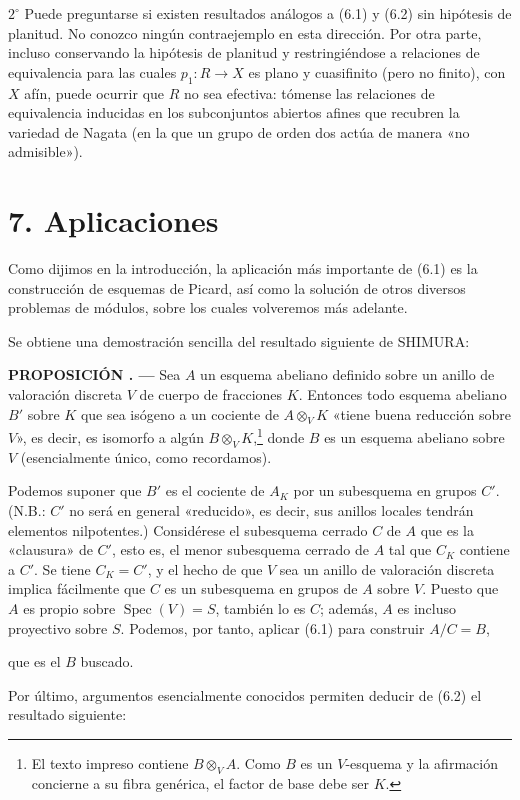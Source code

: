 \documentclass[11pt,twoside,openany]{book}
\numberwithin{equation}{section}
\newcommand{\src}[1]{%
  \phantomsection\hypertarget{src:#1}{}%
  \marginpar{\raggedleft\footnotesize\sffamily #1}%
}
\theoremstyle{plain}
\theoremstyle{definition}
\theoremstyle{remark}
\newcommand{\fsection}[2]{%
  \section*{#1. #2}%
  \addcontentsline{toc}{section}{#1. #2}%
}
\newcommand{\result}[2]{%
  \par\medskip\noindent\textbf{#1%
  \if\relax\detokenize{#2}\relax\else\space#2\fi. ---}\enspace
}
\newcommand{\FgaUnitKey}{frontmatter}
\renewcommand{\src}[1]{%
  \phantomsection\hypertarget{src:\FgaUnitKey:#1}{}%
  \marginpar{\raggedleft\footnotesize\sffamily #1}%
}
\theoremstyle{plain}
\theoremstyle{definition}
\theoremstyle{remark}
\begin{document}
\smallskip
\noindent $2^\circ$ Puede preguntarse si existen resultados análogos a (6.1)
y (6.2) sin hipótesis de planitud. No conozco ningún contraejemplo en esta
dirección. Por otra parte, incluso conservando la hipótesis de planitud y
restringiéndose a relaciones de equivalencia para las cuales $p_1:R\to X$ es
plano y cuasifinito (pero no finito), con $X$ afín, puede ocurrir que $R$ no
sea efectiva: tómense las relaciones de equivalencia inducidas en los
subconjuntos abiertos afines que recubren la variedad de Nagata (en la que un
grupo de orden dos actúa de manera «no admisible»).

\fsection{7}{Aplicaciones}

Como dijimos en la introducción, la aplicación más importante de (6.1) es la
construcción de esquemas de Picard, así como la solución de otros diversos
problemas de módulos, sobre los cuales volveremos más adelante.

Se obtiene una demostración sencilla del resultado siguiente de SHIMURA:

\result{PROPOSICIÓN}{7.1} Sea $A$ un esquema abeliano definido sobre un
anillo de valoración discreta $V$ de cuerpo de fracciones $K$. Entonces todo
esquema abeliano $B'$ sobre $K$ que sea isógeno a un cociente de
$A\otimes_V K$ «tiene buena reducción sobre $V$», es decir, es isomorfo a
algún $B\otimes_V K$,\footnote{El texto impreso contiene $B\otimes_V A$.
Como $B$ es un $V$-esquema y la afirmación concierne a su fibra genérica, el
factor de base debe ser $K$.} donde $B$ es un esquema abeliano sobre $V$
(esencialmente único, como recordamos).

Podemos suponer que $B'$ es el cociente de $A_K$ por un subesquema en grupos
$C'$. (N.B.: $C'$ no será en general «reducido», es decir, sus anillos locales
tendrán elementos nilpotentes.) Considérese el subesquema cerrado $C$ de $A$
que es la «clausura» de $C'$, esto es, el menor subesquema cerrado de $A$ tal
que $C_K$ contiene a $C'$. Se tiene $C_K=C'$, y el hecho de que $V$ sea un
anillo de valoración discreta implica fácilmente que $C$ es un subesquema en
grupos de $A$ sobre $V$. Puesto que $A$ es propio sobre
$\operatorname{Spec}(V)=S$, también lo es $C$; además, $A$ es incluso
proyectivo sobre $S$. Podemos, por tanto, aplicar (6.1) para construir
$A/C=B$,
\src{115}
que es el $B$ buscado.

Por último, argumentos esencialmente conocidos permiten deducir de (6.2) el
resultado siguiente:
\end{document}
